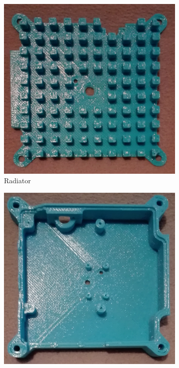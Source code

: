 \begin{figure}[H]
    \centering
    \begin{subfigure}{0.24\textwidth}
        \centering
        \includegraphics[width=0.9\linewidth]{photos/part1.png}
        \caption*{Radiator}
    \end{subfigure}
    \begin{subfigure}{0.24\textwidth}
        \centering
        \includegraphics[width=0.9\linewidth]{photos/part2.png}

\end{subfigure}
\end{figure}
